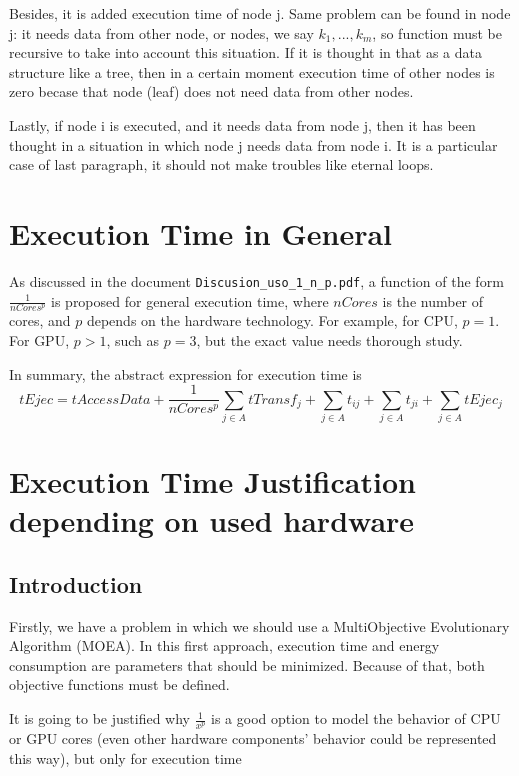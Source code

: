\documentclass{article}
\begin{document}
Besides, it is added execution time of node j. Same problem can be found in node j: it needs data from other node, or nodes, we say \(k_1,...,k_m\), so function must be recursive to take into account this situation. If it is thought in that as a data structure like a tree, then in a certain moment execution time of other nodes is zero becase that node (leaf) does not need data from other nodes.

Lastly, if node i is executed, and it needs data from node j, then it has been thought in a situation in which node j needs data from node i. It is a particular case of last paragraph, it should not make troubles like eternal loops.

\section{Execution Time in General}

As discussed in the document \texttt{Discusion\_uso\_1\_n\_p.pdf}, a function of the form $\frac{1}{nCores^p}$ is proposed for general execution time, where $nCores$ is the number of cores, and $p$ depends on the hardware technology. For example, for CPU, $p=1$. For GPU, $p>1$, such as $p=3$, but the exact value needs thorough study.

In summary, the abstract expression for execution time is
\[
tEjec = tAccessData + \frac{1}{nCores^p} \sum_{j \in A} tTransf_j + \sum_{j \in A} t_{ij} + \sum_{j \in A} t_{ji} + \sum_{j \in A} tEjec_j
\]

\section{Execution Time Justification depending on used hardware}

\subsection{Introduction}

Firstly, we have a problem in which we should use a MultiObjective Evolutionary Algorithm (MOEA). In this first approach, execution time and energy consumption are parameters that should be minimized. Because of that, both objective functions must be defined.

It is going to be justified why $\frac{1}{{x^p}}$ is a good option to model the behavior of CPU or GPU cores (even other hardware components' behavior could be represented this way), but only for execution time
\end{document}
